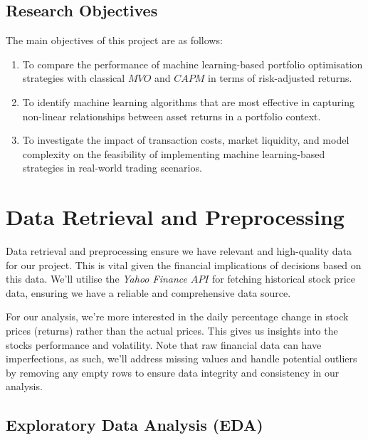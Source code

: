 \documentclass[a4paper,12pt,titlepage]{article}
\numberwithin{equation}{section}
\begin{document}
\subsection{Research Objectives}

The main objectives of this project are as follows:

\begin{enumerate}

	\item To compare the performance of machine learning-based portfolio optimisation strategies 
		with classical $MVO$ and $CAPM$ in terms of risk-adjusted returns.

	\item To identify machine learning algorithms that are most effective in capturing non-linear 
		relationships between asset returns in a portfolio context.

	\item To investigate the impact of transaction costs, market liquidity, and model complexity on the feasibility of implementing machine 
		learning-based strategies in real-world trading scenarios.

\end{enumerate}

\section{Data Retrieval and Preprocessing}

Data retrieval and preprocessing ensure we have relevant and high-quality data for our project. This is 
vital given the financial implications of decisions based on this data. We'll utilise the \textit{Yahoo Finance} $API$ 
for fetching historical stock price data, ensuring we have a reliable and comprehensive data 
source. \newline \par \noindent For our analysis, we're more interested in the daily percentage change in stock prices (returns) 
rather than the actual prices. This gives us insights into the stocks performance and volatility. Note that raw financial data can 
have imperfections, as such, we'll address missing values and handle potential outliers by removing any empty rows to ensure data integrity
and consistency in our analysis.

\subsection{Exploratory Data Analysis (EDA)}
\end{document}
